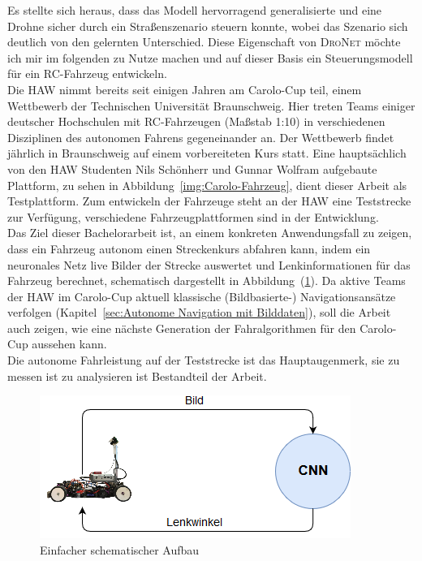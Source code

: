 Es stellte sich heraus, dass das Modell hervorragend generalisierte und eine Drohne sicher durch ein Straßenszenario steuern konnte, wobei das Szenario sich deutlich von den gelernten Unterschied. Diese Eigenschaft von \textsc{DroNet} möchte ich mir im folgenden zu Nutze machen und auf dieser Basis ein Steuerungsmodell für ein RC-Fahrzeug entwickeln.\\

Die HAW nimmt bereits seit einigen Jahren am \glqq Carolo-Cup \grqq{} teil, einem Wettbewerb der Technischen Universität Braunschweig. Hier treten Teams einiger deutscher Hochschulen mit RC-Fahrzeugen (Maßstab 1:10) in verschiedenen Disziplinen des autonomen Fahrens gegeneinander an. Der Wettbewerb findet jährlich in Braunschweig auf einem vorbereiteten Kurs statt.
Eine hauptsächlich von den HAW Studenten Nils Schönherr und Gunnar Wolfram aufgebaute Plattform, zu sehen in Abbildung~\ref{img:Carolo-Fahrzeug}, dient dieser Arbeit als Testplattform.
Zum entwickeln der Fahrzeuge steht an der HAW eine Teststrecke zur Verfügung, verschiedene Fahrzeugplattformen sind in der Entwicklung.\\
Das Ziel dieser Bachelorarbeit ist, an einem konkreten Anwendungsfall zu zeigen, dass ein Fahrzeug autonom einen Streckenkurs abfahren kann, indem ein neuronales Netz live Bilder der Strecke auswertet und Lenkinformationen für das Fahrzeug berechnet, schematisch dargestellt in Abbildung~(\ref{img:Aufbau}). Da aktive Teams der HAW im Carolo-Cup aktuell klassische (Bildbasierte-) Navigationsansätze verfolgen (Kapitel~\ref{sec:Autonome Navigation mit Bilddaten}), soll die Arbeit auch zeigen, wie eine nächste Generation der Fahralgorithmen für den Carolo-Cup aussehen kann.\\

Die autonome Fahrleistung auf der Teststrecke ist das Hauptaugenmerk, sie zu messen ist zu analysieren ist Bestandteil der Arbeit.

\begin{figure}[h]
	\centering
	\includegraphics[scale=0.7]{figures/Aufbau.png}
	\caption{Einfacher schematischer Aufbau }
	\label{img:Aufbau}
\end{figure}


